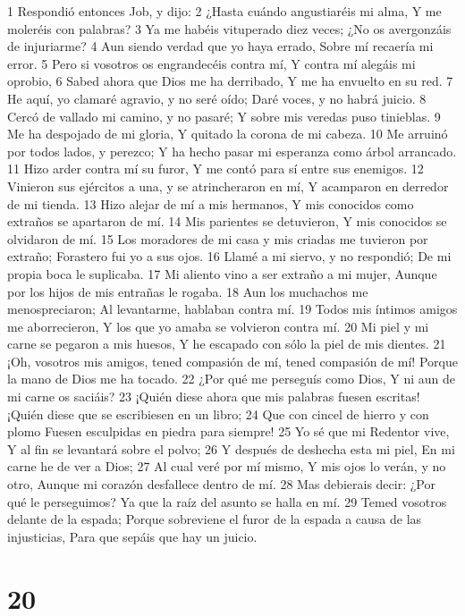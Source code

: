 1 Respondió entonces Job, y dijo:
2 ¿Hasta cuándo angustiaréis mi alma,
Y me moleréis con palabras?
3 Ya me habéis vituperado diez veces;
¿No os avergonzáis de injuriarme?
4 Aun siendo verdad que yo haya errado,
Sobre mí recaería mi error.
5 Pero si vosotros os engrandecéis contra mí,
Y contra mí alegáis mi oprobio,
6 Sabed ahora que Dios me ha derribado,
Y me ha envuelto en su red.
7 He aquí, yo clamaré agravio, y no seré oído;
Daré voces, y no habrá juicio.
8 Cercó de vallado mi camino, y no pasaré;
Y sobre mis veredas puso tinieblas.
9 Me ha despojado de mi gloria,
Y quitado la corona de mi cabeza.
10 Me arruinó por todos lados, y perezco;
Y ha hecho pasar mi esperanza como árbol arrancado.
11 Hizo arder contra mí su furor,
Y me contó para sí entre sus enemigos.
12 Vinieron sus ejércitos a una, y se atrincheraron en mí,
Y acamparon en derredor de mi tienda.
13 Hizo alejar de mí a mis hermanos,
Y mis conocidos como extraños se apartaron de mí.
14 Mis parientes se detuvieron,
Y mis conocidos se olvidaron de mí.
15 Los moradores de mi casa y mis criadas me tuvieron por extraño;
Forastero fui yo a sus ojos.
16 Llamé a mi siervo, y no respondió;
De mi propia boca le suplicaba.
17 Mi aliento vino a ser extraño a mi mujer,
Aunque por los hijos de mis entrañas le rogaba.
18 Aun los muchachos me menospreciaron;
Al levantarme, hablaban contra mí.
19 Todos mis íntimos amigos me aborrecieron,
Y los que yo amaba se volvieron contra mí.
20 Mi piel y mi carne se pegaron a mis huesos,
Y he escapado con sólo la piel de mis dientes.
21 ¡Oh, vosotros mis amigos, tened compasión de mí, tened compasión de mí!
Porque la mano de Dios me ha tocado.
22 ¿Por qué me perseguís como Dios,
Y ni aun de mi carne os saciáis?
23 ¡Quién diese ahora que mis palabras fuesen escritas!
¡Quién diese que se escribiesen en un libro;
24 Que con cincel de hierro y con plomo
Fuesen esculpidas en piedra para siempre!
25 Yo sé que mi Redentor vive,
Y al fin se levantará sobre el polvo;
26 Y después de deshecha esta mi piel,
En mi carne he de ver a Dios;
27 Al cual veré por mí mismo,
Y mis ojos lo verán, y no otro,
Aunque mi corazón desfallece dentro de mí.
28 Mas debierais decir: ¿Por qué le perseguimos?
Ya que la raíz del asunto se halla en mí.
29 Temed vosotros delante de la espada;
Porque sobreviene el furor de la espada a causa de las injusticias,
Para que sepáis que hay un juicio.

\chapter{20}

